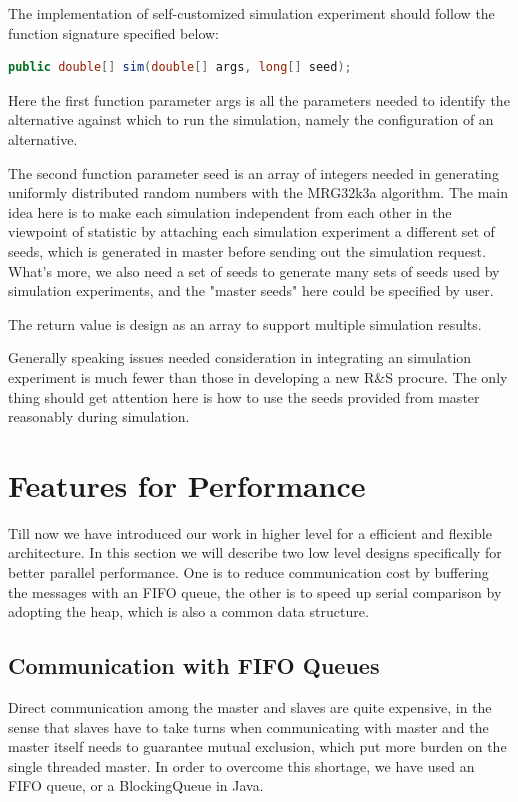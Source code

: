 \documentclass[12pt,a4paper]{report}
\begin{document}
The implementation of self-customized simulation experiment should follow the function signature specified below:

\begin{lstlisting}[language=Java]
public double[] sim(double[] args, long[] seed);
\end{lstlisting}

Here the first function parameter args is all the parameters needed to identify the alternative against which to run the simulation, namely the configuration of an alternative.

The second function parameter seed is an array of integers needed in generating uniformly distributed random numbers with the MRG32k3a algorithm. The main idea here is to make each simulation independent from each other in the viewpoint of statistic by attaching each simulation experiment a different set of seeds, which is generated in master before sending out the simulation request. What's more, we also need a set of seeds to generate many sets of seeds used by simulation experiments, and the "master seeds" here could be specified by user.

The return value is design as an array to support multiple simulation results.

Generally speaking issues needed consideration in integrating an simulation experiment is much fewer than those in developing a new R\&S procure. The only thing should get attention here is how to use the seeds provided from master reasonably during simulation.

\section{Features for Performance}

Till now we have introduced our work in higher level for a efficient and flexible architecture. In this section we will describe two low level designs specifically for better parallel performance. One is to reduce communication cost by buffering the messages with an FIFO queue, the other is to speed up serial comparison by adopting the heap, which is also a common data structure.

\subsection{Communication with FIFO Queues}

Direct communication among the master and slaves are quite expensive, in the sense that slaves have to take turns when communicating with master and the master itself needs to guarantee mutual exclusion, which put more burden on the single threaded master. In order to overcome this shortage, we have used an FIFO queue, or a BlockingQueue in Java.
\end{document}
